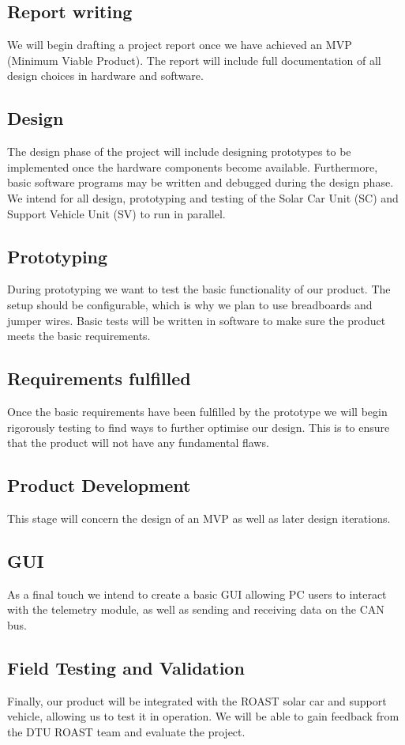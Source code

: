\documentclass[]{article}
\begin{document}
\subsection*{Report writing}
We will begin drafting a project report once we have achieved an MVP (Minimum Viable Product). The report will include full documentation of all design choices in hardware and software. 
\subsection*{Design}
The design phase of the project will include designing prototypes to be implemented once the hardware components become available. Furthermore, basic software programs may be written and debugged during the design phase. We intend for all design, prototyping and testing of the Solar Car Unit (SC) and Support Vehicle Unit (SV) to run in parallel. 
\subsection*{Prototyping}
During prototyping we want to test the basic functionality of our product. The setup should be configurable, which is why we plan to use breadboards and jumper wires. Basic tests will be written in software to make sure the product meets the basic requirements. 
\subsection*{Requirements fulfilled}
Once the basic requirements have been fulfilled by the prototype we will begin rigorously testing to find ways to further optimise our design. This is to ensure that the product will not have any fundamental flaws. 
\subsection*{Product Development}
This stage will concern the design of an MVP as well as later design iterations. 
\subsection*{GUI}
As a final touch we intend to create a basic GUI allowing PC users to interact with the telemetry module, as well as sending and receiving data on the CAN bus. 
\subsection*{Field Testing and Validation}
Finally, our product will be integrated with the ROAST solar car and support vehicle, allowing us to test it in operation. We will be able to gain feedback from the DTU ROAST team and evaluate the project. 
\newpage
\end{document}
